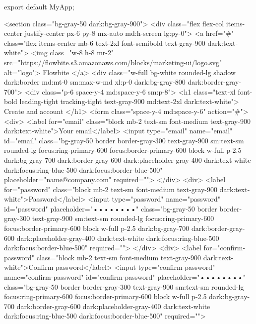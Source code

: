 export default MyApp;





<section class="bg-gray-50 dark:bg-gray-900">
  <div class="flex flex-col items-center justify-center px-6 py-8 mx-auto md:h-screen lg:py-0">
      <a href="#" class="flex items-center mb-6 text-2xl font-semibold text-gray-900 dark:text-white">
          <img class="w-8 h-8 mr-2" src="https://flowbite.s3.amazonaws.com/blocks/marketing-ui/logo.svg" alt="logo">
          Flowbite    
      </a>
      <div class="w-full bg-white rounded-lg shadow dark:border md:mt-0 sm:max-w-md xl:p-0 dark:bg-gray-800 dark:border-gray-700">
          <div class="p-6 space-y-4 md:space-y-6 sm:p-8">
              <h1 class="text-xl font-bold leading-tight tracking-tight text-gray-900 md:text-2xl dark:text-white">
                  Create and account
              </h1>
              <form class="space-y-4 md:space-y-6" action="#">
                  <div>
                      <label for="email" class="block mb-2 text-sm font-medium text-gray-900 dark:text-white">Your email</label>
                      <input type="email" name="email" id="email" class="bg-gray-50 border border-gray-300 text-gray-900 sm:text-sm rounded-lg focus:ring-primary-600 focus:border-primary-600 block w-full p-2.5 dark:bg-gray-700 dark:border-gray-600 dark:placeholder-gray-400 dark:text-white dark:focus:ring-blue-500 dark:focus:border-blue-500" placeholder="name@company.com" required="">
                  </div>
                  <div>
                      <label for="password" class="block mb-2 text-sm font-medium text-gray-900 dark:text-white">Password</label>
                      <input type="password" name="password" id="password" placeholder="••••••••" class="bg-gray-50 border border-gray-300 text-gray-900 sm:text-sm rounded-lg focus:ring-primary-600 focus:border-primary-600 block w-full p-2.5 dark:bg-gray-700 dark:border-gray-600 dark:placeholder-gray-400 dark:text-white dark:focus:ring-blue-500 dark:focus:border-blue-500" required="">
                  </div>
                  <div>
                      <label for="confirm-password" class="block mb-2 text-sm font-medium text-gray-900 dark:text-white">Confirm password</label>
                      <input type="confirm-password" name="confirm-password" id="confirm-password" placeholder="••••••••" class="bg-gray-50 border border-gray-300 text-gray-900 sm:text-sm rounded-lg focus:ring-primary-600 focus:border-primary-600 block w-full p-2.5 dark:bg-gray-700 dark:border-gray-600 dark:placeholder-gray-400 dark:text-white dark:focus:ring-blue-500 dark:focus:border-blue-500" required="">
